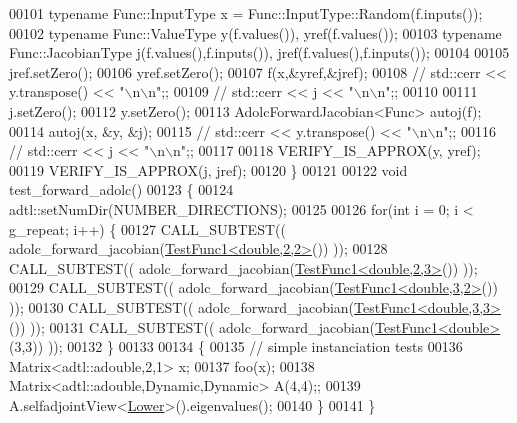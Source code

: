 \begin{DoxyCode}
00101     \textcolor{keyword}{typename} Func::InputType x = Func::InputType::Random(f.inputs());
00102     \textcolor{keyword}{typename} Func::ValueType y(f.values()), yref(f.values());
00103     \textcolor{keyword}{typename} Func::JacobianType j(f.values(),f.inputs()), jref(f.values(),f.inputs());
00104 
00105     jref.setZero();
00106     yref.setZero();
00107     f(x,&yref,&jref);
00108 \textcolor{comment}{//     std::cerr << y.transpose() << "\(\backslash\)n\(\backslash\)n";;}
00109 \textcolor{comment}{//     std::cerr << j << "\(\backslash\)n\(\backslash\)n";;}
00110 
00111     j.setZero();
00112     y.setZero();
00113     AdolcForwardJacobian<Func> autoj(f);
00114     autoj(x, &y, &j);
00115 \textcolor{comment}{//     std::cerr << y.transpose() << "\(\backslash\)n\(\backslash\)n";;}
00116 \textcolor{comment}{//     std::cerr << j << "\(\backslash\)n\(\backslash\)n";;}
00117 
00118     VERIFY\_IS\_APPROX(y, yref);
00119     VERIFY\_IS\_APPROX(j, jref);
00120 \}
00121 
00122 \textcolor{keywordtype}{void} test\_forward\_adolc()
00123 \{
00124   adtl::setNumDir(NUMBER\_DIRECTIONS);
00125 
00126   \textcolor{keywordflow}{for}(\textcolor{keywordtype}{int} i = 0; i < g\_repeat; i++) \{
00127     CALL\_SUBTEST(( adolc\_forward\_jacobian(\hyperlink{struct_test_func1}{TestFunc1<double,2,2>}()) ));
00128     CALL\_SUBTEST(( adolc\_forward\_jacobian(\hyperlink{struct_test_func1}{TestFunc1<double,2,3>}()) ));
00129     CALL\_SUBTEST(( adolc\_forward\_jacobian(\hyperlink{struct_test_func1}{TestFunc1<double,3,2>}()) ));
00130     CALL\_SUBTEST(( adolc\_forward\_jacobian(\hyperlink{struct_test_func1}{TestFunc1<double,3,3>}()) ));
00131     CALL\_SUBTEST(( adolc\_forward\_jacobian(\hyperlink{struct_test_func1}{TestFunc1<double>}(3,3)) ));
00132   \}
00133 
00134   \{
00135     \textcolor{comment}{// simple instanciation tests}
00136     Matrix<adtl::adouble,2,1> x;
00137     foo(x);
00138     Matrix<adtl::adouble,Dynamic,Dynamic> A(4,4);;
00139     A.selfadjointView<\hyperlink{group__enums_gga39e3366ff5554d731e7dc8bb642f83cda891792b8ed394f7607ab16dd716f60e6}{Lower}>().eigenvalues();
00140   \}
00141 \}
\end{DoxyCode}
